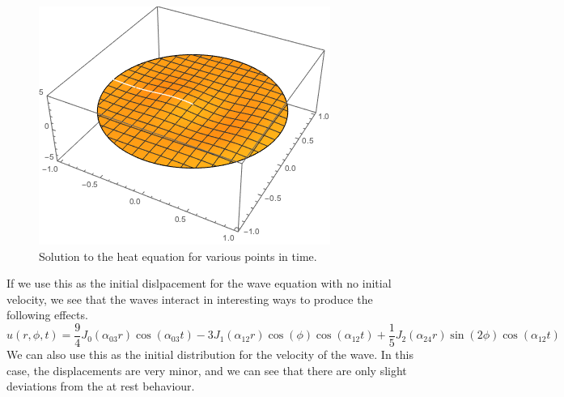 \documentclass{paper}
\begin{document}
\begin{figure}[!htb]
      \includegraphics[width=\linewidth]{images/heat3.png}
    \endminipage
    \caption{Solution to the heat equation for various points in time.}
    \end{figure}
If we use this as the initial dislpacement for the wave equation with no initial velocity, we see that the waves interact in interesting ways to produce the following effects.
\begin{equation}
    u(r,\phi,t)=\frac{9}{4}J_0(\alpha_{03}r)\cos(\alpha_{03} t)-3 J_1(\alpha_{12}r)\cos(\phi)\cos(\alpha_{12} t)+\frac{1}{5} J_2(\alpha_{24}r)\sin(2\phi)\cos(\alpha_{12} t)

\end{equation}
We can also use this as the initial distribution for the velocity of the wave. In this case, the displacements are very minor, and we can see that there are only slight deviations from the at rest behaviour.
\end{document}

